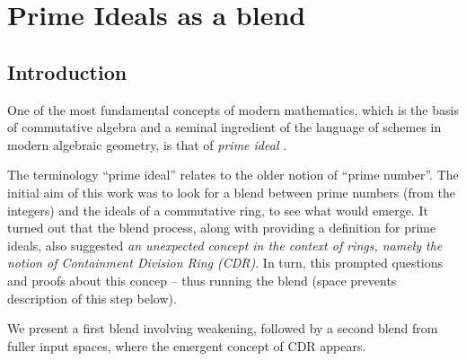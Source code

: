 \section{Prime Ideals as a blend}
\label{sec:prime_ideals}

\subsection*{Introduction}
One of the most fundamental concepts of modern mathematics, which is
the basis of commutative algebra and a seminal ingredient of the
language of schemes in modern algebraic geometry, is that of
\emph{prime ideal} \parencite{EGAI,eisenbud}.

The terminology ``prime ideal'' relates to the older notion of ``prime
number''. The initial aim of this work was to look for a blend between
prime numbers (from the integers) and the ideals of a commutative
ring, to see what would emerge. It turned out that the blend process,
along with providing a definition for prime ideals, also suggested 
\emph{an unexpected concept in the context of rings, namely the notion of
Containment Division Ring (CDR)}. In turn, this prompted questions and
proofs about this concep -- thus running the blend (space prevents
description of this step below).

We present a first blend involving weakening, followed by a second
blend from fuller input spaces, where the emergent concept of CDR
appears.



